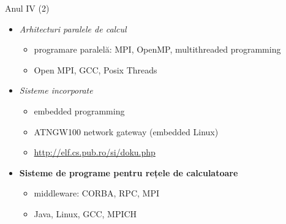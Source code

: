 \documentclass{simple}
\begin{document}

\begin{frame}{Anul IV (2)}
	\begin{itemize}
		\item \textit{Arhitecturi paralele de calcul}
			\begin{itemize}
				\item programare paralelă: MPI, OpenMP, multithreaded
				programming
				\item Open MPI, GCC, Posix Threads
			\end{itemize}
		\item \textit{Sisteme incorporate}
			\begin{itemize}
				\item embedded programming
				\item ATNGW100 network gateway (embedded Linux)
				\item \url{http://elf.cs.pub.ro/si/doku.php}
			\end{itemize}
		\item \textbf{Sisteme de programe pentru rețele de calculatoare}
			\begin{itemize}
				\item middleware: CORBA, RPC, MPI
				\item Java, Linux, GCC, MPICH
			\end{itemize}
	\end{itemize}
\end{frame}
\end{document}
